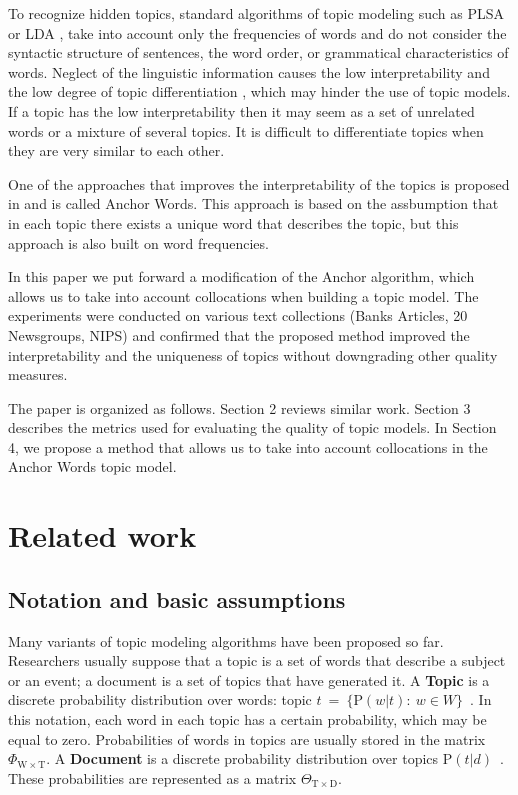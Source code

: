 \documentclass[runningheads,a4paper]{llncs}
\begin{document}
To recognize hidden topics, standard algorithms of topic modeling such as PLSA or LDA \cite{hofmann1999probabilistic,blei2003latent}, take into account only the frequencies of words and do not consider the syntactic structure of sentences, the word order, or grammatical characteristics of words. Neglect of the linguistic information causes the low interpretability and the low degree of topic differentiation \cite{vorontsov2014additive}, which may hinder the use of topic models. If a topic has the low interpretability then it may seem as a set of unrelated words or a mixture of several topics. It is difficult to differentiate  topics when they are very similar to each other.

One of the approaches that improves the interpretability of the topics is proposed in \cite{arora2012learning,arora2012practical} and is called Anchor Words. This approach is based on the assbumption that in each topic there exists a unique word that describes the topic, but this approach is also built on word frequencies.

In this paper we put forward a modification of the Anchor algorithm, which allows us to take into account collocations when building a topic model. The experiments were conducted on various text collections (Banks Articles, 20 Newsgroups, NIPS) and confirmed that the proposed method improved the interpretability and the uniqueness of topics without downgrading other quality measures.

The paper is organized as follows. Section 2 reviews similar work. Section 3 describes the metrics used for evaluating the quality of topic models. In Section 4, we propose a method that allows us to take into account collocations in the Anchor Words topic model.

\section{Related work}
	\subsection{Notation and basic assumptions} 
	Many variants of topic modeling algorithms have been proposed so far.  Researchers usually suppose that a topic is a set of words that describe a subject or an event;  a document is a set of topics that have generated it. A {\bf Topic}  is a discrete probability distribution over words: topic $t~=~\{\mathrm{P}(w|t):~w \in W\}$~\cite{hofmann1999probabilistic,blei2003latent}. In this notation, each word in each topic has a certain probability,  which may be equal to zero. Probabilities of words in topics are usually stored in the matrix $\Phi_{\mathrm{W} \times \mathrm{T}}$. A {\bf Document} is a discrete probability distribution over topics $\mathrm{P}(t|d)$~\cite{hofmann1999probabilistic,blei2003latent}. These probabilities  are represented as a  matrix $\Theta _{\mathrm{T} \times \mathrm{D}}$.
		
\end{document}
